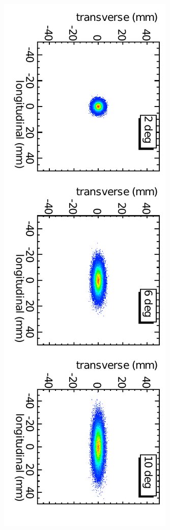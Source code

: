 \documentclass[aps,prstab,onecolumn,superscriptaddress,showpacs]{revtex4}
\begin{document}
\begin{figure}
  \includegraphics[angle=90,width=0.9\linewidth]{figures/Turn-0.pdf}

\end{figure}
\end{document}
